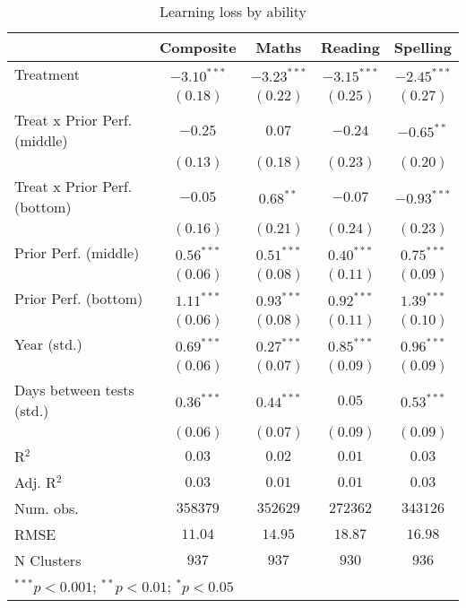 
\begin{table}
\begin{center}
\begin{tabular}{l c c c c}
\hline
 & Composite & Maths & Reading & Spelling \\
\hline
Treatment                    & $-3.10^{***}$ & $-3.23^{***}$ & $-3.15^{***}$ & $-2.45^{***}$ \\
                             & $(0.18)$      & $(0.22)$      & $(0.25)$      & $(0.27)$      \\
Treat x Prior Perf. (middle) & $-0.25$       & $0.07$        & $-0.24$       & $-0.65^{**}$  \\
                             & $(0.13)$      & $(0.18)$      & $(0.23)$      & $(0.20)$      \\
Treat x Prior Perf. (bottom) & $-0.05$       & $0.68^{**}$   & $-0.07$       & $-0.93^{***}$ \\
                             & $(0.16)$      & $(0.21)$      & $(0.24)$      & $(0.23)$      \\
Prior Perf. (middle)         & $0.56^{***}$  & $0.51^{***}$  & $0.40^{***}$  & $0.75^{***}$  \\
                             & $(0.06)$      & $(0.08)$      & $(0.11)$      & $(0.09)$      \\
Prior Perf. (bottom)         & $1.11^{***}$  & $0.93^{***}$  & $0.92^{***}$  & $1.39^{***}$  \\
                             & $(0.06)$      & $(0.08)$      & $(0.11)$      & $(0.10)$      \\
Year (std.)                  & $0.69^{***}$  & $0.27^{***}$  & $0.85^{***}$  & $0.96^{***}$  \\
                             & $(0.06)$      & $(0.07)$      & $(0.09)$      & $(0.09)$      \\
Days between tests (std.)    & $0.36^{***}$  & $0.44^{***}$  & $0.05$        & $0.53^{***}$  \\
                             & $(0.06)$      & $(0.07)$      & $(0.09)$      & $(0.09)$      \\
\hline
R$^2$                        & $0.03$        & $0.02$        & $0.01$        & $0.03$        \\
Adj. R$^2$                   & $0.03$        & $0.01$        & $0.01$        & $0.03$        \\
Num. obs.                    & $358379$      & $352629$      & $272362$      & $343126$      \\
RMSE                         & $11.04$       & $14.95$       & $18.87$       & $16.98$       \\
N Clusters                   & $937$         & $937$         & $930$         & $936$         \\
\hline
\multicolumn{5}{l}{\scriptsize{$^{***}p<0.001$; $^{**}p<0.01$; $^{*}p<0.05$}}
\end{tabular}
\caption{Learning loss by ability}
\label{tableability}
\end{center}
\end{table}
